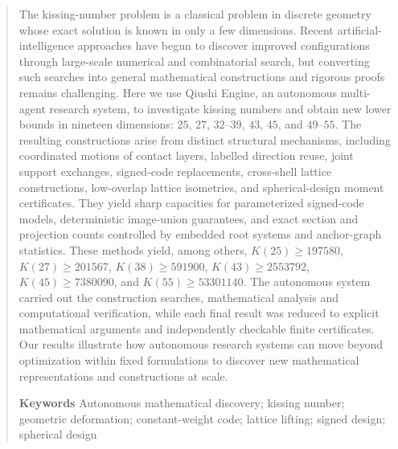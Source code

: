 \begin{abstract}
The kissing-number problem is a classical problem in discrete geometry
whose exact solution is known in only a few dimensions. Recent
artificial-intelligence approaches have begun to discover improved
configurations through large-scale numerical and combinatorial search,
but converting such searches into general mathematical constructions and
rigorous proofs remains challenging. Here we use Qiushi Engine, an autonomous
multi-agent research system, to investigate kissing numbers and obtain
new lower bounds in nineteen dimensions: $25$, $27$, $32$--$39$, $43$,
$45$, and $49$--$55$. The resulting constructions arise from distinct
structural mechanisms, including coordinated motions of contact layers,
labelled direction reuse, joint support exchanges, signed-code
replacements, cross-shell lattice constructions, low-overlap lattice
isometries, and spherical-design moment certificates. They yield sharp
capacities for parameterized signed-code models, deterministic image-union
guarantees, and exact section and projection counts controlled by embedded
root systems and anchor-graph statistics. These methods
yield, among others, $K(25)\ge197580$, $K(27)\ge201567$,
$K(38)\ge591900$, $K(43)\ge2553792$, $K(45)\ge7380090$, and
$K(55)\ge53301140$. The autonomous system carried out the construction
searches, mathematical analysis and computational verification, while
each final result was reduced to explicit mathematical arguments and
independently checkable finite certificates. Our results illustrate how
autonomous research systems can move beyond optimization within fixed
formulations to discover new mathematical representations and
constructions at scale.

\par\smallskip\noindent\textbf{Keywords}\quad
Autonomous mathematical discovery; kissing number; geometric deformation;
constant-weight code; lattice lifting; signed design; spherical design
\end{abstract}
